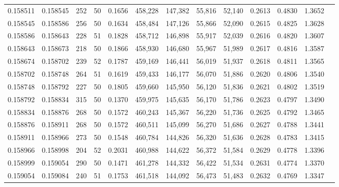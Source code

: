 \begin{tabular}{rrrrrrrrrrrrr}
0.158511 & 0.158545 &   252 &  50 &                                     0.1656 & 458,228 & 147,382 &  55,816 &  52,140 & 0.2613 & 0.4830 & 1.3652 \\
0.158545 & 0.158586 &   256 &  50 &                                     0.1634 & 458,484 & 147,126 &  55,866 &  52,090 & 0.2615 & 0.4825 & 1.3628 \\
0.158586 & 0.158643 &   228 &  51 &                                     0.1828 & 458,712 & 146,898 &  55,917 &  52,039 & 0.2616 & 0.4820 & 1.3607 \\
0.158643 & 0.158673 &   218 &  50 &                                     0.1866 & 458,930 & 146,680 &  55,967 &  51,989 & 0.2617 & 0.4816 & 1.3587 \\
0.158674 & 0.158702 &   239 &  52 &                                     0.1787 & 459,169 & 146,441 &  56,019 &  51,937 & 0.2618 & 0.4811 & 1.3565 \\
0.158702 & 0.158748 &   264 &  51 &                                     0.1619 & 459,433 & 146,177 &  56,070 &  51,886 & 0.2620 & 0.4806 & 1.3540 \\
0.158748 & 0.158792 &   227 &  50 &                                     0.1805 & 459,660 & 145,950 &  56,120 &  51,836 & 0.2621 & 0.4802 & 1.3519 \\
0.158792 & 0.158834 &   315 &  50 &                                     0.1370 & 459,975 & 145,635 &  56,170 &  51,786 & 0.2623 & 0.4797 & 1.3490 \\
0.158834 & 0.158876 &   268 &  50 &                                     0.1572 & 460,243 & 145,367 &  56,220 &  51,736 & 0.2625 & 0.4792 & 1.3465 \\
0.158876 & 0.158911 &   268 &  50 &                                     0.1572 & 460,511 & 145,099 &  56,270 &  51,686 & 0.2627 & 0.4788 & 1.3441 \\
0.158911 & 0.158966 &   273 &  50 &                                     0.1548 & 460,784 & 144,826 &  56,320 &  51,636 & 0.2628 & 0.4783 & 1.3415 \\
0.158966 & 0.158998 &   204 &  52 &                                     0.2031 & 460,988 & 144,622 &  56,372 &  51,584 & 0.2629 & 0.4778 & 1.3396 \\
0.158999 & 0.159054 &   290 &  50 &                                     0.1471 & 461,278 & 144,332 &  56,422 &  51,534 & 0.2631 & 0.4774 & 1.3370 \\
0.159054 & 0.159084 &   240 &  51 &                                     0.1753 & 461,518 & 144,092 &  56,473 &  51,483 & 0.2632 & 0.4769 & 1.3347 \\

\end{tabular}
